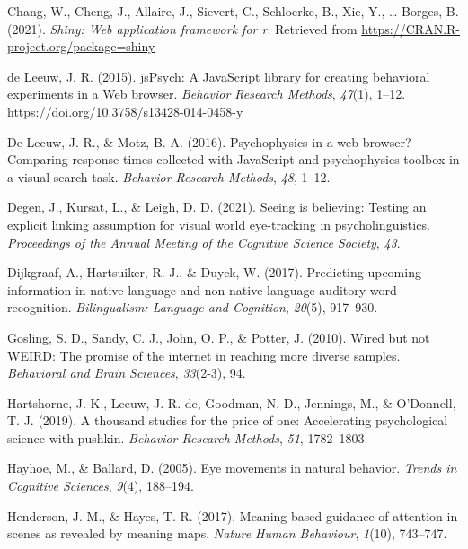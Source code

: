 \documentclass[
  man,floatsintext]{apa6}
\newlength{\cslhangindent}
\newenvironment{CSLReferences}[2] %
 {\begin{list}{}{%
  \setlength{\itemindent}{0pt}
  \setlength{\leftmargin}{0pt}
  \setlength{\parsep}{0pt}
  \ifodd #1
   \setlength{\leftmargin}{\cslhangindent}
   \setlength{\itemindent}{-1\cslhangindent}
  \fi
  \setlength{\itemsep}{#2\baselineskip}}}
 {\end{list}}
\begin{document}
\begin{CSLReferences}{1}{0}
Chang, W., Cheng, J., Allaire, J., Sievert, C., Schloerke, B., Xie, Y., \ldots{} Borges, B. (2021). \emph{Shiny: Web application framework for r}. Retrieved from \url{https://CRAN.R-project.org/package=shiny}

de Leeuw, J. R. (2015). {jsPsych}: {A JavaScript} library for creating behavioral experiments in a {Web} browser. \emph{Behavior Research Methods}, \emph{47}(1), 1--12. \url{https://doi.org/10.3758/s13428-014-0458-y}

De Leeuw, J. R., \& Motz, B. A. (2016). Psychophysics in a web browser? Comparing response times collected with JavaScript and psychophysics toolbox in a visual search task. \emph{Behavior Research Methods}, \emph{48}, 1--12.

Degen, J., Kursat, L., \& Leigh, D. D. (2021). Seeing is believing: Testing an explicit linking assumption for visual world eye-tracking in psycholinguistics. \emph{Proceedings of the Annual Meeting of the Cognitive Science Society}, \emph{43}.

Dijkgraaf, A., Hartsuiker, R. J., \& Duyck, W. (2017). Predicting upcoming information in native-language and non-native-language auditory word recognition. \emph{Bilingualism: Language and Cognition}, \emph{20}(5), 917--930.

Gosling, S. D., Sandy, C. J., John, O. P., \& Potter, J. (2010). Wired but not WEIRD: The promise of the internet in reaching more diverse samples. \emph{Behavioral and Brain Sciences}, \emph{33}(2-3), 94.

Hartshorne, J. K., Leeuw, J. R. de, Goodman, N. D., Jennings, M., \& O'Donnell, T. J. (2019). A thousand studies for the price of one: Accelerating psychological science with pushkin. \emph{Behavior Research Methods}, \emph{51}, 1782--1803.

Hayhoe, M., \& Ballard, D. (2005). Eye movements in natural behavior. \emph{Trends in Cognitive Sciences}, \emph{9}(4), 188--194.

Henderson, J. M., \& Hayes, T. R. (2017). Meaning-based guidance of attention in scenes as revealed by meaning maps. \emph{Nature Human Behaviour}, \emph{1}(10), 743--747.


\end{CSLReferences}
\end{document}
